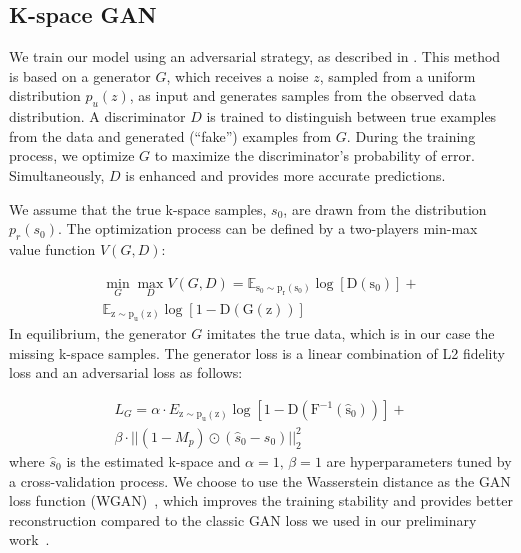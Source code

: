 \documentclass[10pt,journal,compsoc]{IEEEtran}
\begin{document}
\subsection{K-space GAN}
We train our model using an adversarial strategy, as described in \cite{goodfellow2014generative,radford2015unsupervised}. 
This method is based on a generator $G$, which receives a noise \textbf{$z$}, sampled from a uniform distribution \textbf{$p_{u}\left(z\right)$}, as input and generates samples from the observed data distribution. A discriminator $D$ is trained to distinguish between true examples from the data and generated (``fake'') examples from $G.$ During the training process, we optimize $G$ to maximize the discriminator's probability of error. Simultaneously, $D$ is enhanced and provides more accurate predictions.

We assume that the true k-space samples, $s_{0}$, are drawn from the distribution $p_{r}\left(s_{0}\right)$. The optimization process can be defined by a two-players min-max value function $V(G,D)$:

\begin{equation}
\begin{split}
\min_{G}\max_{D}V(G,D) = \mathbb{E_{\mathrm{s_{0}\sim p_{r}\left(s_{0}\right)}}\mathrm{\log\left[D\left(s_{0}\right)\right]}}+
\\
\mathbb{E_{\mathrm{z\sim p_{u}\left(z\right)}}\mathrm{\log\left[1-D\left(G(z)\right)\right]}}
\end{split}
\end{equation}
In equilibrium, the generator $G$ imitates the true data, which is in our case the missing k-space samples. The generator loss is a linear combination of L2 fidelity loss and an adversarial loss as follows:

\begin{equation}
\begin{aligned}L_{G}=\alpha\cdot E_{\mathrm{z\sim p_{u}\left(z\right)}}\mathrm{\log\left[1-D\left(F^{-1}\left(\hat{s}_{0}\right)\right)\right]}+\\
\beta\cdot||\left(1-M_{p}\right)\odot\left(\hat{s}_{0}-s_{0}\right)||_{2}^{2}
\end{aligned}
\end{equation}
where $\hat{s}_{0}$ is the estimated k-space and $\alpha=1,\,\beta=1$ are hyperparameters tuned by a cross-validation process.
We choose to use the Wasserstein distance as the GAN loss function (WGAN)~\cite{arjovsky2017wasserstein}, which improves the training stability and provides better reconstruction compared to the classic GAN loss we used in our preliminary work~\cite{shitrit2017accelerated}.
\end{document}
